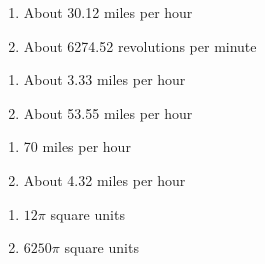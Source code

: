 
\begin{multicols}{2}

\begin{enumerate}

\setcounter{enumi}{\value{HW}}

\item About 30.12 miles per hour
\item About 6274.52 revolutions per minute

\setcounter{HW}{\value{enumi}}

\end{enumerate}

\end{multicols}

\begin{multicols}{2}

\begin{enumerate}

\setcounter{enumi}{\value{HW}}

\item About 3.33 miles per hour
\item About 53.55 miles per hour

\setcounter{HW}{\value{enumi}}

\end{enumerate}

\end{multicols}

\begin{multicols}{2}

\begin{enumerate}

\setcounter{enumi}{\value{HW}}

\item 70 miles per hour
\item About 4.32 miles per hour

\setcounter{HW}{\value{enumi}}

\end{enumerate}

\end{multicols}

\begin{multicols}{2}

\begin{enumerate}

\setcounter{enumi}{\value{HW}}

\addtocounter{enumi}{1}

\item $12\pi$ square units
\item $6250\pi$ square units 

\setcounter{HW}{\value{enumi}}

\end{enumerate}

\end{multicols}

